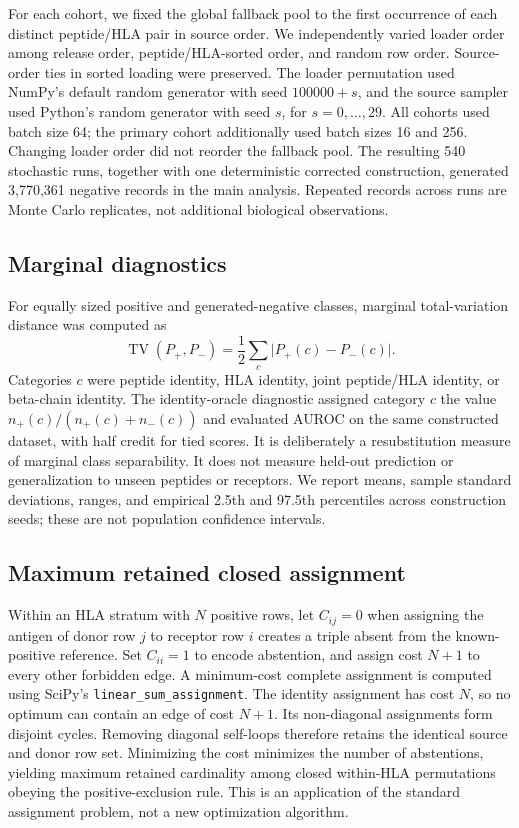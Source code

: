 For each cohort, we fixed the global fallback pool to the first occurrence of
each distinct peptide/HLA pair in source order. We independently varied loader
order among release order, peptide/HLA-sorted order, and random row order.
Source-order ties in sorted loading were preserved. The loader permutation used
NumPy's default random generator with seed $100000+s$, and the source sampler
used Python's random generator with seed $s$, for $s=0,\ldots,29$. All cohorts
used batch size 64; the primary cohort additionally used batch sizes 16 and 256.
Changing loader order did not reorder the fallback pool. The resulting 540
stochastic runs, together with one deterministic corrected construction,
generated 3,770,361 negative records in the main analysis. Repeated records
across runs are Monte Carlo replicates, not additional biological observations.

\subsection{Marginal diagnostics}
For equally sized positive and generated-negative classes, marginal
total-variation distance was computed as
\begin{equation}
  \operatorname{TV}(P_+,P_-)=\frac12\sum_c\lvert P_+(c)-P_-(c)\rvert.
\end{equation}
Categories $c$ were peptide identity, HLA identity, joint peptide/HLA identity,
or beta-chain identity. The identity-oracle diagnostic assigned category $c$
the value $n_+(c)/(n_+(c)+n_-(c))$ and evaluated AUROC on the same constructed
dataset, with half credit for tied scores. It is deliberately a resubstitution
measure of marginal class separability. It does not measure held-out prediction
or generalization to unseen peptides or receptors. We report means, sample
standard deviations, ranges, and empirical 2.5th and 97.5th percentiles across
construction seeds; these are not population confidence intervals.

\subsection{Maximum retained closed assignment}
Within an HLA stratum with $N$ positive rows, let $C_{ij}=0$ when assigning the
antigen of donor row $j$ to receptor row $i$ creates a triple absent from the
known-positive reference. Set $C_{ii}=1$ to encode abstention, and assign cost
$N+1$ to every other forbidden edge. A minimum-cost complete assignment is
computed using SciPy's \texttt{linear\_sum\_assignment}. The identity assignment
has cost $N$, so no optimum can contain an edge of cost $N+1$. Its non-diagonal
assignments form disjoint cycles. Removing diagonal self-loops therefore retains
the identical source and donor row set. Minimizing the cost minimizes the number
of abstentions, yielding maximum retained cardinality among closed within-HLA
permutations obeying the positive-exclusion rule. This is an application of the
standard assignment problem, not a new optimization algorithm.

